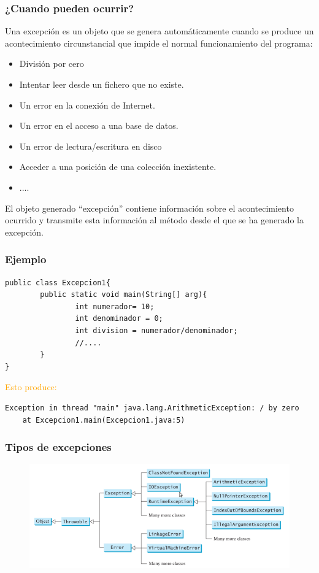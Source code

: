 \documentclass{beamer}
\begin{document}
\begin{frame}[fragile]
\frametitle{¿Cuando pueden ocurrir?}
Una excepción es un objeto que se genera automáticamente cuando se produce un acontecimiento circunstancial que impide el normal funcionamiento del programa:
\begin{itemize}[<+->]
\item División por cero
\item Intentar leer desde un fichero que no existe.
\item Un error en la conexión de Internet.
\item Un error en el acceso a una base de datos.
\item Un error de lectura/escritura en disco
\item Acceder a una posición de una colección inexistente.
\item ....
\end{itemize}
\pause
El objeto generado “excepción” contiene información sobre el acontecimiento ocurrido y transmite esta información al método desde el que se ha generado la excepción.
\end{frame}

\begin{frame}[fragile]
\frametitle{Ejemplo}
\begin{verbatim}
public class Excepcion1{
        public static void main(String[] arg){
                int numerador= 10;
                int denominador = 0;
                int division = numerador/denominador;
                //....
        }
}
\end{verbatim}
\pause 
\textcolor{orange}{Esto produce:}
\pause
\begin{footnotesize}
\begin{verbatim}
Exception in thread "main" java.lang.ArithmeticException: / by zero
	at Excepcion1.main(Excepcion1.java:5)

\end{verbatim}
\end{footnotesize}
\end{frame}

\begin{frame}
\frametitle{Tipos de excepciones}
\begin{figure}
\includegraphics[scale=0.5]{imagenes/excepciones.png}
\end{figure}
\end{frame}
\end{document}
